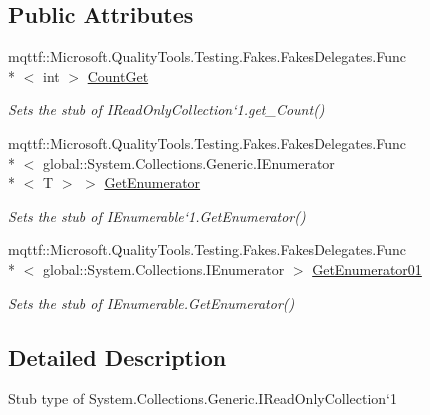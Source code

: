 \subsection*{Public Attributes}
\begin{DoxyCompactItemize}
\item 
mqttf\-::\-Microsoft.\-Quality\-Tools.\-Testing.\-Fakes.\-Fakes\-Delegates.\-Func\\*
$<$ int $>$ \hyperlink{class_system_1_1_collections_1_1_generic_1_1_fakes_1_1_stub_i_read_only_collection_3_01_t_01_4_a1963e492b3755b69ff5d1fc1263ebb10}{Count\-Get}
\begin{DoxyCompactList}\small\item\em Sets the stub of I\-Read\-Only\-Collection`1.get\-\_\-\-Count()\end{DoxyCompactList}\item 
mqttf\-::\-Microsoft.\-Quality\-Tools.\-Testing.\-Fakes.\-Fakes\-Delegates.\-Func\\*
$<$ global\-::\-System.\-Collections.\-Generic.\-I\-Enumerator\\*
$<$ T $>$ $>$ \hyperlink{class_system_1_1_collections_1_1_generic_1_1_fakes_1_1_stub_i_read_only_collection_3_01_t_01_4_ae12522305da461bf87be05b9a1912286}{Get\-Enumerator}
\begin{DoxyCompactList}\small\item\em Sets the stub of I\-Enumerable`1.Get\-Enumerator()\end{DoxyCompactList}\item 
mqttf\-::\-Microsoft.\-Quality\-Tools.\-Testing.\-Fakes.\-Fakes\-Delegates.\-Func\\*
$<$ global\-::\-System.\-Collections.\-I\-Enumerator $>$ \hyperlink{class_system_1_1_collections_1_1_generic_1_1_fakes_1_1_stub_i_read_only_collection_3_01_t_01_4_a63de8ffcd679091fef87c8065faf9639}{Get\-Enumerator01}
\begin{DoxyCompactList}\small\item\em Sets the stub of I\-Enumerable.\-Get\-Enumerator()\end{DoxyCompactList}\end{DoxyCompactItemize}


\subsection{Detailed Description}
Stub type of System.\-Collections.\-Generic.\-I\-Read\-Only\-Collection`1



